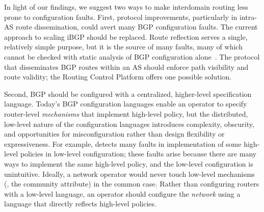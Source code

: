 
In light of our findings, we suggest two ways to make interdomain
routing less prone to configuration faults.  First, protocol
improvements, particularly in intra-AS route dissemination, could avert
many BGP configuration faults.  The current approach to scaling iBGP
should be replaced.  Route reflection serves a single, relatively simple
purpose, but it is the source of many faults, many of which cannot be
checked with static analysis of BGP configuration
alone~\cite{Griffin2002}.  The protocol that disseminates BGP routes
within an AS should enforce path visibility and route validity; the
Routing Control Platform offers one possible solution.

Second, BGP should be configured with a centralized, higher-level
specification language.  Today's BGP configuration languages enable an
operator to specify router-level {\em mechanisms} that implement
high-level policy, but the distributed, low-level nature of the
configuration languages introduces complexity, obscurity, and
opportunities for misconfiguration rather than design flexibility or
expressiveness.  For example, \rcc detects many faults in implementation
of some high-level policies in low-level configuration; these faults
arise because there are many ways to implement the same high-level
policy, and the low-level configuration is unintuitive.  Ideally, a
network operator would never touch low-level mechanisms (\eg, the
community attribute) in the common case.  Rather than configuring
routers with a low-level language, an operator should configure the {\em
network} using a language that directly reflects high-level
policies.






